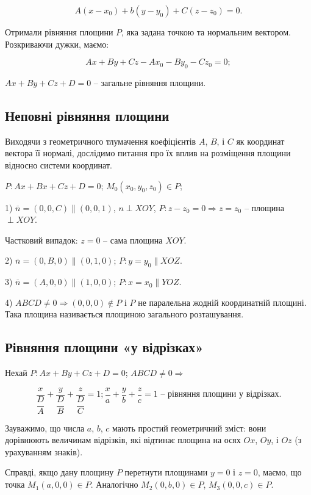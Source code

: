 $$A(x - x_0) + b(y - y_0) + C(z - z_0) = 0.$$

Отримали рівняння площини $P$, яка задана
точкою та нормальним вектором. Розкриваючи
дужки, маємо:

$$Ax + By + Cz - Ax_0 - By_0 - Cz_0 = 0;$$

$Ax + By + Cz + D = 0$ -- загальне рівняння
площини.


\subsection{Неповні рівняння площини}

Виходячи з геометричного тлумачення коефіцієнтів $A$, $B$, і $C$ як
координат вектора її нормалі, дослідимо питання про їх вплив на розміщення
площини відносно системи координат.

$P: Ax + Bx + Cz + D = 0$; $M_0(x_0,y_0,z_0) \in P$;

1) $\overline{n} = (0,0,C) \parallel (0,0,1)$, $n \perp XOY$,
$P : z - z_0 = 0 \Rightarrow z = z_0$ -- площина $\perp XOY$.

Частковий випадок: $z = 0$ -- сама площина $XOY$.

2) $\overline{n} = (0,B,0) \parallel (0,1,0)$; $P: y = y_0 \parallel XOZ$.

3) $\overline{n} = (A,0,0) \parallel (1,0,0)$; $P: x = x_0 \parallel YOZ$.

4) $ABCD \neq 0 \Rightarrow (0,0,0) \notin P$ і $P$ не паралельна жодній координатній
площині. Така площина називається площиною загального розташування.


\subsection{Рівняння площини «у відрізках»}

Нехай $P: Ax + By + Cz + D = 0$; $ABCD \neq 0 \Rightarrow$

$$\dfrac{x}{\dfrac{D}{A}} + \dfrac{y}{\dfrac{D}{B}} + \dfrac{z}{\dfrac{D}{C}} = 1;
\dfrac{x}{a} + \dfrac{y}{b} + \dfrac{z}{c} = 1
\text{ -- рівняння площини у відрізках}.$$


Зауважимо, що числа $a$, $b$, $c$ мають простий геометричний зміст: вони
дорівнюють величинам відрізків, які відтинає площина на осях $Ox$, $Oy$, і
$Oz$ (з урахуванням знаків).

Справді, якщо дану площину $P$
перетнути площинами $y = 0$ і $z = 0$,
маємо, що точка $M_1(a,0,0) \in P$.
Аналогічно $M_2(0,b,0) \in P$,
$M_3(0,0,c) \in P$.


